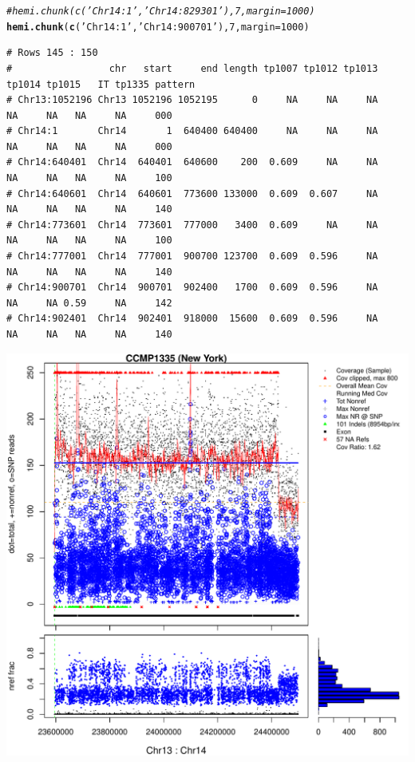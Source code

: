 \documentclass{article}\usepackage[]{graphicx}\usepackage[]{color}
\makeatletter
\def\maxwidth{ %
  \ifdim\Gin@nat@width>\linewidth
    \linewidth
  \else
    \Gin@nat@width
  \fi
}
\newcommand{\hlnum}[1]{\textcolor[rgb]{0.686,0.059,0.569}{#1}}%
\newcommand{\hlstr}[1]{\textcolor[rgb]{0.192,0.494,0.8}{#1}}%
\newcommand{\hlcom}[1]{\textcolor[rgb]{0.678,0.584,0.686}{\textit{#1}}}%
\newcommand{\hlstd}[1]{\textcolor[rgb]{0.345,0.345,0.345}{#1}}%
\newcommand{\hlkwc}[1]{\textcolor[rgb]{0.333,0.667,0.333}{#1}}%
\newcommand{\hlkwd}[1]{\textcolor[rgb]{0.737,0.353,0.396}{\textbf{#1}}}%
\newenvironment{kframe}{%
 \def\at@end@of@kframe{}%
 \ifinner\ifhmode%
  \def\at@end@of@kframe{\end{minipage}}%
  \begin{minipage}{\columnwidth}%
 \fi\fi%
 \def\FrameCommand##1{\hskip\@totalleftmargin \hskip-\fboxsep
 \colorbox{shadecolor}{##1}\hskip-\fboxsep
     \hskip-\linewidth \hskip-\@totalleftmargin \hskip\columnwidth}%
 \MakeFramed {\advance\hsize-\width
   \@totalleftmargin\z@ \linewidth\hsize
   \@setminipage}}%
 {\par\unskip\endMakeFramed%
 \at@end@of@kframe}
\newenvironment{knitrout}{}{} %
\makeatother
\begin{document}
\begin{knitrout}\footnotesize
{}\color{fgcolor}\begin{kframe}
\begin{alltt}
\hlcom{#hemi.chunk(c('Chr14:1','Chr14:829301'),7,margin=1000)}
\hlkwd{hemi.chunk}\hlstd{(}\hlkwd{c}\hlstd{(}\hlstr{'Chr14:1'}\hlstd{,}\hlstr{'Chr14:900701'}\hlstd{),}\hlnum{7}\hlstd{,}\hlkwc{margin}\hlstd{=}\hlnum{1000}\hlstd{)}
\end{alltt}
\begin{verbatim}
# Rows 145 : 150 
#                 chr   start     end length tp1007 tp1012 tp1013 tp1014 tp1015   IT tp1335 pattern
# Chr13:1052196 Chr13 1052196 1052195      0     NA     NA     NA     NA     NA   NA     NA     000
# Chr14:1       Chr14       1  640400 640400     NA     NA     NA     NA     NA   NA     NA     000
# Chr14:640401  Chr14  640401  640600    200  0.609     NA     NA     NA     NA   NA     NA     100
# Chr14:640601  Chr14  640601  773600 133000  0.609  0.607     NA     NA     NA   NA     NA     140
# Chr14:773601  Chr14  773601  777000   3400  0.609     NA     NA     NA     NA   NA     NA     100
# Chr14:777001  Chr14  777001  900700 123700  0.609  0.596     NA     NA     NA   NA     NA     140
# Chr14:900701  Chr14  900701  902400   1700  0.609  0.596     NA     NA     NA 0.59     NA     142
# Chr14:902401  Chr14  902401  918000  15600  0.609  0.596     NA     NA     NA   NA     NA     140
\end{verbatim}
\end{kframe}

{\centering \includegraphics[width=\maxwidth]{figs-knitr/unnamed-chunk-44-1} 

}



\end{knitrout}
\end{document}
